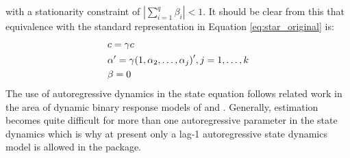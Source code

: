 with a stationarity constraint of $\left| {\sum\limits_{i = 1}^q {{\beta _i}} } \right| < 1$.
It should be  clear from this that equivalence with the standard representation
in Equation \ref{eq:star_original} is:
\begin{equation}
\begin{gathered}
   c = \gamma c \hfill \\
   \alpha ' = \gamma {\left( {1,{\alpha _2}, \ldots ,{\alpha _j}} \right)^\prime },j = 1, \ldots ,k \hfill \\
  \beta = 0 \hfill
\end{gathered}
\end{equation}
The use of autoregressive dynamics in the state equation follows related work in
the area of dynamic binary response models of \cite{Kauppi2008} and \cite{Nyberg2010}.
Generally, estimation becomes quite difficult for more than one autoregressive
parameter in the state dynamics which is why at present only a lag-1
autoregressive state dynamics model is allowed in the package.

